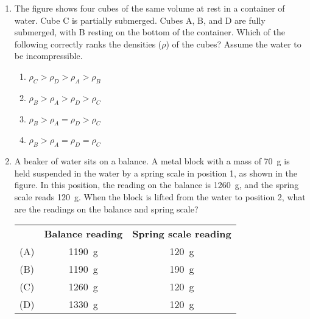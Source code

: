 \documentclass{../../../oss-apphys}
\begin{document}
\begin{multicols}{2}
\begin{enumerate}[leftmargin=18pt,start=3]
    \columnbreak
    
  \item The figure shows four cubes of the same volume at rest in a container
    of water. Cube C is partially submerged. Cubes A, B, and D are fully
    submerged, with B resting on the bottom of the container. Which of the
    following correctly ranks the densities ($\rho$) of the cubes? Assume the
    water to be incompressible.
    \begin{center}
      \vspace{-.15in}
    \end{center}
    \begin{enumerate}[noitemsep,topsep=0pt,leftmargin=18pt,label=(\Alph*)]
    \item $\rho_C >\rho_D >\rho_A >\rho_B$
    \item $\rho_B >\rho_A >\rho_D >\rho_C$
    \item $\rho_B >\rho_A =\rho_D >\rho_C$
    \item $\rho_B >\rho_A =\rho_D =\rho_C$
    \end{enumerate}

  \item A beaker of water sits on a balance. A metal block with a mass of
    \SI{70}{\gram} is held suspended in the water by a spring scale in position
    1, as shown in the figure. In this position, the reading on the balance is
    \SI{1260}{\gram}, and the spring scale reads \SI{120}{g}. When the block is
    lifted from the water to position 2, what are the readings on the balance
    and spring scale?
    \begin{center}
      \vspace{-.15in}

      \begin{tabular}{c c c}
        & \textbf{Balance reading} & \textbf{Spring scale reading}\\
        (A) & \SI{1190}{\gram} & \SI{120}{\gram}\\
        (B) & \SI{1190}{\gram} & \SI{190}{\gram}\\
        (C) & \SI{1260}{\gram} & \SI{120}{\gram}\\
        (D) & \SI{1330}{\gram} & \SI{120}{\gram}
      \end{tabular}
    \end{center}

    \columnbreak
    

\end{enumerate}
\end{multicols}
\end{document}
